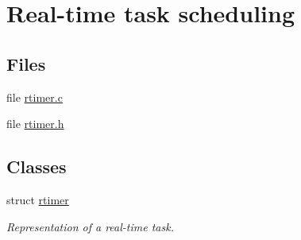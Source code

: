 \hypertarget{group__rt}{\section{Real-\/time task scheduling}
\label{group__rt}
}
\subsection*{Files}
\begin{DoxyCompactItemize}
\item 
file \hyperlink{rtimer_8c}{rtimer.\-c}
\item 
file \hyperlink{rtimer_8h}{rtimer.\-h}
\end{DoxyCompactItemize}
\subsection*{Classes}
\begin{DoxyCompactItemize}
\item 
struct \hyperlink{structrtimer}{rtimer}
\begin{DoxyCompactList}\small\item\em Representation of a real-\/time task. \end{DoxyCompactList}\end{DoxyCompactItemize}
